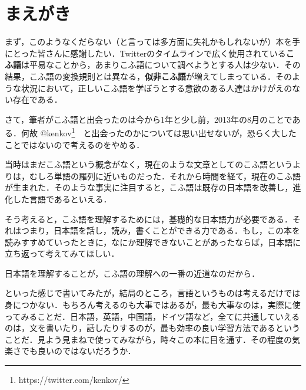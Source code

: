 \chapter*{まえがき}
まず，このようなくだらない（と言っては多方面に失礼かもしれないが）本を手にとった皆さんに感謝したい．Twitterのタイムラインで広く使用されている\textbf{こふ語}は平易なことから，あまりこふ語について調べようとする人は少ない．その結果，こふ語の変換規則とは異なる，\textbf{似非こふ語}が増えてしまっている．そのような状況において，正しいこふ語を学ぼうとする意欲のある人達はかけがえのない存在である．

\vspace{2em}

さて，筆者がこふ語と出会ったのは今から1年と少し前，2013年の8月のことである．何故 @kenkov\footnote{https://twitter.com/kenkov/}　と出会ったのかについては思い出せないが，恐らく大したことではないので考えるのをやめる．\par
当時はまだこふ語という概念がなく，現在のような文章としてのこふ語というよりは，むしろ単語の羅列に近いものだった．それから時間を経て，現在のこふ語が生まれた．そのような事実に注目すると，こふ語は既存の日本語を改善し，進化した言語であるといえる．\par
そう考えると，こふ語を理解するためには，基礎的な日本語力が必要である．それはつまり，日本語を話し，読み，書くことができる力である．もし，この本を読みすすめていったときに，なにか理解できないことがあったならば，日本語に立ち返って考えてみてほしい．\par
日本語を理解することが，こふ語の理解への一番の近道なのだから．

\vspace{2em}

といった感じで書いてみたが，結局のところ，言語というものは考えるだけでは身につかない．もちろん考えるのも大事ではあるが，最も大事なのは，実際に使ってみることだ．日本語，英語，中国語，ドイツ語など，全てに共通していえるのは，文を書いたり，話したりするのが，最も効率の良い学習方法であるということだ．見よう見まねで使ってみながら，時々この本に目を通す．その程度の気楽さでも良いのではないだろうか．